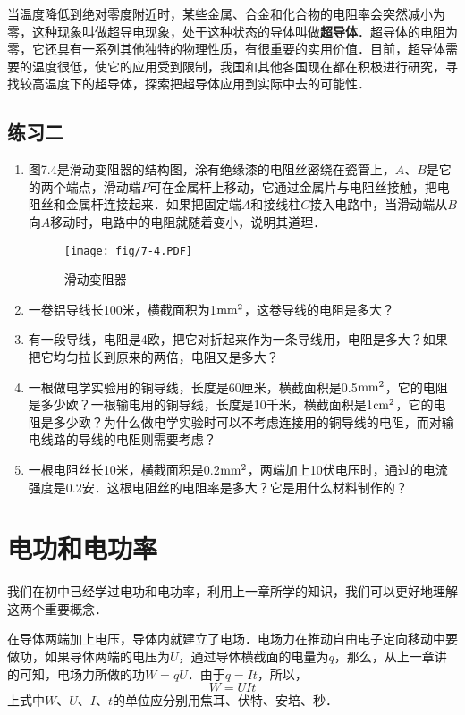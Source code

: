 当温度降低到绝对零度附近时，某些金属、合金和化合物的电阻率会突然减小为零，这种现象叫做超导电现象，处于这种状态的导体叫做\textbf{超导体}．超导体的电阻为零，它还具有一系列其他独特的物理性质，有很重要的实用价值．目前，超导体需要的温度很低，使它的应用受到限制，我国和其他各国现在都在积极进行研究，寻找较高温度下的超导体，探索把超导体应用到实际中去的可能性．

\subsection*{练习二}

\begin{enumerate}
    \item 图7.4是滑动变阻器的结构图，涂有绝缘漆的电阻丝密绕在瓷管上，$A$、$B$是它的两个端点，滑动端$P$可在金属杆上移动，它通过金属片与电阻丝接触，把电阻丝和金属杆连接起来．如果把固定端$A$和接线柱$C$接入电路中，当滑动端从$B$向$A$移动时，电路中的电阻就随着变小，说明其道理．
    \begin{figure}[htp]\centering
        \texttt{[image: fig/7-4.PDF]}
        \caption{滑动变阻器}
        \end{figure}
    \item 一卷铝导线长100米，横截面积为1${\rm mm}^2$，这卷导线的电阻是多大？
    \item 有一段导线，电阻是4欧，把它对折起来作为一条导线用，电阻是多大？如果把它均匀拉长到原来的两倍，电阻又是多大？
    \item 一根做电学实验用的铜导线，长度是60厘米，横截面积是0.5${\rm mm}^2$，它的电阻是多少欧？一根输电用的铜导线，长度是10千米，横截面积是1${\rm cm}^2$，它的电阻是多少欧？为什么做电学实验时可以不考虑连接用的铜导线的电阻，而对输电线路的导线的电阻则需要考虑？
    \item 一根电阻丝长10米，横截面积是0.2${\rm mm}^2$，两端加上10伏电压时，通过的电流强度是0.2安．这根电阻丝的电阻率是多大？它是用什么材料制作的？
\end{enumerate}

\section{电功和电功率}
我们在初中已经学过电功和电功率，利用上一章所学的知识，我们可以更好地理解这两个重要概念．

在导体两端加上电压，导体内就建立了电场．电场力在推动自由电子定向移动中要做功，如果导体两端的电压为$U$，通过导体横截面的电量为$q$，那么，从上一章讲的可知，电场力所做的功$W=qU$．由于$q=It$，所以，
\[W=UIt\]
上式中$W$、$U$、$I$、$t$的单位应分别用焦耳、伏特、安培、秒．

